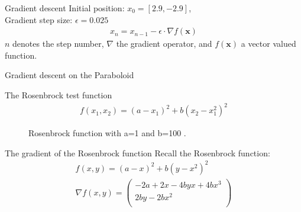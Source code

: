 \documentclass{beamer}
\begin{document}
    \begin{frame}{Gradient descent}
      Initial position: $x_0 = [2.9, -2.9]$, \\
      Gradient step size: $\epsilon = 0.025 $
      \begin{align}
        x_n = x_{n-1} - \epsilon \cdot \nabla f(\mathbf{x})
      \end{align}
      $n$ denotes the step number, $\nabla$ the gradient operator, and $f(\mathbf{x})$ a vector valued function.
    \end{frame}

    \begin{frame}{Gradient descent on the Paraboloid}
      \centering
    \end{frame}

    \begin{frame}{The Rosenbrock test function}
      \begin{align}
        f(x_1, x_2) = (a - x_1)^2 + b(x_2 - x_1^2)^2
      \end{align}
      \begin{figure}
        
        \caption{Rosenbrock function with a=1 and b=100 .}
      \end{figure}
    \end{frame}

    \begin{frame}{The gradient of the Rosenbrock function}
      Recall the Rosenbrock function:
      \begin{align}
        f(x, y) = (a - x)^2 + b(y - x^2)^2 \\
        \nabla f(x, y) = \begin{pmatrix}
          -2a + 2x - 4byx + 4bx^3 \\
          2by - 2bx^2 \\
        \end{pmatrix}
      \end{align}
    \end{frame}
\end{document}
